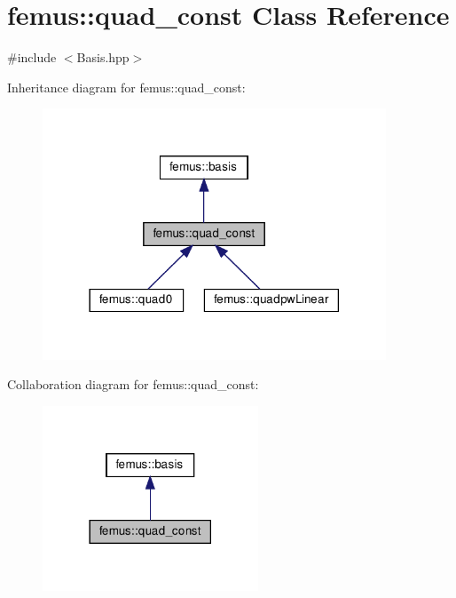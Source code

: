 \hypertarget{classfemus_1_1quad__const}{}\section{femus\+:\+:quad\+\_\+const Class Reference}
\label{classfemus_1_1quad__const}


{\ttfamily \#include $<$Basis.\+hpp$>$}



Inheritance diagram for femus\+:\+:quad\+\_\+const\+:
\nopagebreak
\begin{figure}[H]
\begin{center}
\leavevmode
\includegraphics[width=290pt]{classfemus_1_1quad__const__inherit__graph}
\end{center}
\end{figure}


Collaboration diagram for femus\+:\+:quad\+\_\+const\+:
\nopagebreak
\begin{figure}[H]
\begin{center}
\leavevmode
\includegraphics[width=182pt]{classfemus_1_1quad__const__coll__graph}
\end{center}
\end{figure}
